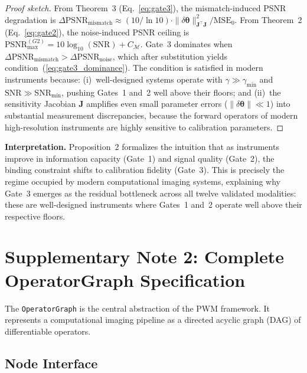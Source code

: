 \documentclass[11pt]{article}
\begin{document}
\begin{proof}[Proof sketch]
From Theorem~3 (Eq.~\ref{eq:gate3}), the mismatch-induced PSNR degradation is
$\Delta\mathrm{PSNR}_{\mathrm{mismatch}} \approx (10/\ln 10) \cdot \|\delta\boldsymbol{\theta}\|_{\mathbf{J}^\top\mathbf{J}}^2 / \mathrm{MSE}_0$.
From Theorem~2 (Eq.~\ref{eq:gate2}), the noise-induced PSNR ceiling is
$\mathrm{PSNR}_{\max}^{(G2)} = 10\log_{10}(\mathrm{SNR}) + C_{\mathcal{M}}$.
Gate~3 dominates when $\Delta\mathrm{PSNR}_{\mathrm{mismatch}} > \Delta\mathrm{PSNR}_{\mathrm{noise}}$, which after substitution yields condition~(\ref{eq:gate3_dominance}). The condition is satisfied in modern instruments because: (i)~well-designed systems operate with $\gamma \gg \gamma_{\min}$ and $\mathrm{SNR} \gg \mathrm{SNR}_{\min}$, pushing Gates~1 and~2 well above their floors; and (ii)~the sensitivity Jacobian $\mathbf{J}$ amplifies even small parameter errors ($\|\delta\boldsymbol{\theta}\| \ll 1$) into substantial measurement discrepancies, because the forward operators of modern high-resolution instruments are highly sensitive to calibration parameters.
\end{proof}

\noindent\textbf{Interpretation.}
Proposition~2 formalizes the intuition that as instruments improve in information capacity (Gate~1) and signal quality (Gate~2), the binding constraint shifts to calibration fidelity (Gate~3). This is precisely the regime occupied by modern computational imaging systems, explaining why Gate~3 emerges as the residual bottleneck across all twelve validated modalities: these are well-designed instruments where Gates~1 and~2 operate well above their respective floors.

\newpage

\section{Supplementary Note 2: Complete OperatorGraph Specification}
\label{sec:opgraph}

The \texttt{OperatorGraph} is the central abstraction of the PWM framework.
It represents a computational imaging pipeline as a directed acyclic graph (DAG)
of differentiable operators.

\subsection{Node Interface}
\end{document}
